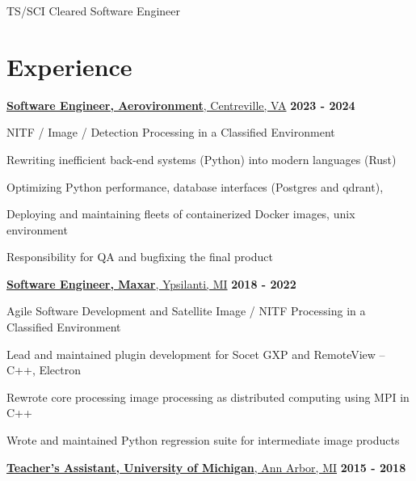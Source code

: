 \documentclass[margin,line]{resume}
\begin{document}
\begin{resume}

    \hfill {\Huge TS/SCI Cleared Software Engineer}\\

    \section{\mysidestyle Experience}
    \hfill

    \underline{\textbf{Software Engineer, Aerovironment}, Centreville, VA}
    \hfill \textbf{\hfill 2023 - 2024} \\

    \begin{list2}
    \item NITF / Image / Detection Processing in a Classified Environment
    \item Rewriting inefficient back-end systems (Python) into modern languages (Rust)
    \item Optimizing Python performance, database interfaces (Postgres and qdrant), 
    \item Deploying and maintaining fleets of containerized Docker images, unix environment
    \item Responsibility for QA and bugfixing the final product
    \end{list2}

    \underline{\textbf{Software Engineer, Maxar}, Ypsilanti, MI}
    \hfill \textbf{\hfill 2018 - 2022} \\

    \begin{list2}
    \item Agile Software Development and Satellite Image / NITF Processing in a Classified Environment
    \item Lead and maintained plugin development for Socet GXP and RemoteView -- C++, Electron
    \item Rewrote core processing image processing as distributed computing using MPI in C++
    \item Wrote and maintained Python regression suite for intermediate image products
    \end{list2}

    \underline{\textbf{Teacher's Assistant, University of Michigan}, Ann Arbor, MI}
    \hfill \textbf{2015 - 2018} \\


\end{resume}
\end{document}
